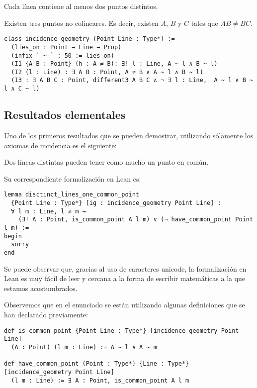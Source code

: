 \begin{ax}\label{I2}
	Cada línea contiene al menos dos puntos distintos.
\end{ax}

\begin{ax}\label{I3}
	Existen tres puntos no colineares. Es decir, existen $A$, $B$ y $C$ tales que
	$AB\neq BC$.
\end{ax}

\begin{lstlisting}
class incidence_geometry (Point Line : Type*) :=
  (lies_on : Point → Line → Prop)
  (infix ` ~ ` : 50 := lies_on)
  (I1 {A B : Point} (h : A ≠ B): ∃! l : Line, A ~ l ∧ B ~ l)
  (I2 (l : Line) : ∃ A B : Point, A ≠ B ∧ A ~ l ∧ B ~ l)
  (I3 : ∃ A B C : Point, different3 A B C ∧ ¬ ∃ l : Line,  A ~ l ∧ B ~ l ∧ C ~ l)
\end{lstlisting}

\subsection{Resultados elementales}

Uno de los primeros resultados que se pueden demostrar, utilizando sólamente los
axiomas de incidencia es el siguiente:

\begin{prop}
	Dos líneas distintas pueden tener como mucho un punto en común.
\end{prop}


Su correspondiente formalización en Lean es:


\begin{lstlisting}
lemma disctinct_lines_one_common_point 
  {Point Line : Type*} [ig : incidence_geometry Point Line] :
  ∀ l m : Line, l ≠ m → 
    (∃! A : Point, is_common_point A l m) ∨ (¬ have_common_point Point l m) := 
begin
  sorry
end
\end{lstlisting}


Se puede observar que, gracias al uso de caracteres unicode, la formalización en
Lean es muy fácil de leer y cercana a la forma de escribir matemáticas a la que
estamos acostumbrados.


Observemos que en el enunciado se están utilizando algunas definiciones que se
han declarado previamente:

\begin{lstlisting}
def is_common_point {Point Line : Type*} [incidence_geometry Point Line] 
  (A : Point) (l m : Line) := A ~ l ∧ A ~ m 

def have_common_point (Point : Type*) {Line : Type*} [incidence_geometry Point Line]
  (l m : Line) := ∃ A : Point, is_common_point A l m
\end{lstlisting}


